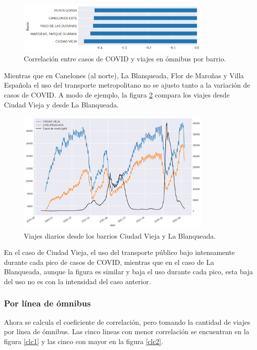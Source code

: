 \documentclass[conference]{IEEEtran}
\begin{document}
\begin{figure}[htbp]
\centerline{\includegraphics[width=95mm]{Pictures/cb2c.png}}
\caption{Correlación entre casos de COVID y viajes en ómnibus por barrio.}
\label{cbc2}
\end{figure}

Mientras que en Canelones (al norte), La Blanqueada, Flor de Maroñas y Villa Española el uso del transporte metropolitano no se ajusto tanto a la variación de casos de COVID. A modo de ejemplo, la figura \ref{cbp} compara los viajes desde Ciudad Vieja y desde La Blanqueada.

\begin{figure}[htbp]
\centerline{\includegraphics[width=95mm]{Pictures/cbp.png}}
\caption{Viajes diarios desde los barrios Ciudad Vieja y La Blanqueada.}
\label{cbp}
\end{figure}

En el caso de Ciudad Vieja, el uso del transporte público bajo intensamente durante cada pico de casos de COVID, mientras que en el caso de La Blanqueada, aunque la figura es similar y baja el uso durante cada pico, esta baja del uso no es con la intensidad del caso anterior.

\subsubsection{Por línea de ómnibus}

Ahora se calcula el coeficiente de correlación, pero tomando la cantidad de viajes por línea de ómnibus. Las cinco lineas con menor correlación se encuentran en la figura \ref{clc1} y las cinco con mayor en la figura \ref{clc2}.
\end{document}
